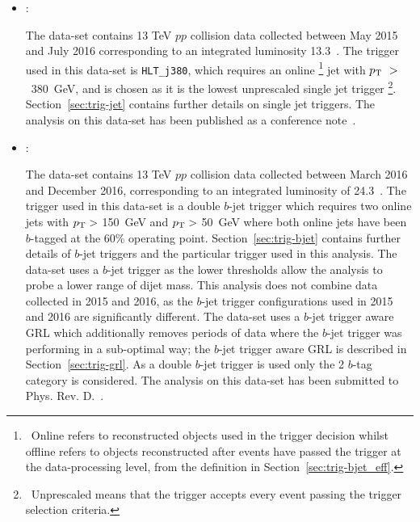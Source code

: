 \begin{itemize}[leftmargin=*]
\item\textbf{\summer{}}:

  \vspace{0.5em}
  The \summer{} data-set contains 13 TeV $pp$ collision data collected
  between May 2015 and July 2016 corresponding to an integrated luminosity 13.3~\ifb.
  The trigger used in this data-set is \verb|HLT_j380|,
  which requires an online \footnote{\ Online refers to
    reconstructed objects used in the trigger decision
  whilst offline refers to objects reconstructed after events have passed the trigger at the data-processing level,
  from the definition in Section~\ref{sec:trig-bjet_eff}.}  jet with $p_{\mathrm{T}}~>$~380~GeV, 
  and is chosen as it is the lowest unprescaled single jet trigger \footnote{\ Unprescaled means that the trigger accepts every event passing the trigger selection criteria.}.
  Section~\ref{sec:trig-jet} contains further details on single jet triggers.
  The analysis on this data-set has been published as a conference note~\cite{dibjet-ichep_conf}. \\

\newpage
\item\textbf{\lm{}}:

  \vspace{0.5em}
  The \lm{} data-set contains 13 TeV $pp$ collision data collected
  between March 2016 and December 2016, corresponding to an integrated luminosity of 24.3~\ifb.
  The trigger used in this data-set is a double $b$-jet trigger 
  which requires two online jets with $p_{\mathrm{T}} >$ 150~GeV and $p_{\mathrm{T}} >$ 50~GeV
  where both online jets have been $b$-tagged at the 60\% operating point.
  Section~\ref{sec:trig-bjet} contains further details of $b$-jet triggers and the particular trigger used in this analysis.
  The \lm{} data-set uses a $b$-jet trigger as the lower \pT{} thresholds allow
  the analysis to probe a lower range of dijet mass.
  This analysis does not combine data collected in 2015 and 2016, as the $b$-jet trigger configurations used in 2015 and 2016 are significantly different.
  The \lm{} data-set uses a $b$-jet trigger aware GRL which additionally
  removes periods of data where the $b$-jet trigger was performing in a sub-optimal way;
  the $b$-jet trigger aware GRL is described in Section~\ref{sec:trig-grl}.
  As a double $b$-jet trigger is used only the 2 $b$-tag category is considered.
  The analysis on this data-set has been submitted to Phys. Rev. D.~\cite{dibjet-full}.
\end{itemize}

